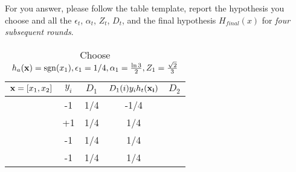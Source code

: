 For you answer, please follow the table template, report the
hypothesis you choose and all the $\epsilon_t$, $\alpha_t$, $Z_t$,
$D_t$, and the final hypothesis $H_{final}(x)$ for {\em four
  subsequent rounds}.
\begin{table}[H]
  \centering
  \caption{Choose $h_a({\bf x}) = \operatorname{sgn}(x_1), \epsilon_1 = 1/4, \alpha_1 = \frac{\ln3}{2}, Z_1 = \frac{\sqrt{2}}{3}$}
  \label{tab:Ada1}
  \begin{tabular}{|c|c|c|c|c|}
    \hline
    ${\bf x} = [x_1,x_2]$ & $y_i$ & $D_1$ & $D_{1}(i)y_{i}h_t({\bf x_i})$ & $D_2$ \\ \hline
    [1,1]                 & -1    & 1/4   & -1/4                          &       \\ \hline
    [1,-1]                & +1    & 1/4   & 1/4                           &       \\ \hline
    [-1,-1]               & -1    & 1/4   & 1/4                           &       \\ \hline
    [-1,-1]               & -1    & 1/4   & 1/4                           &       \\ \hline
  \end{tabular}
\end{table}


